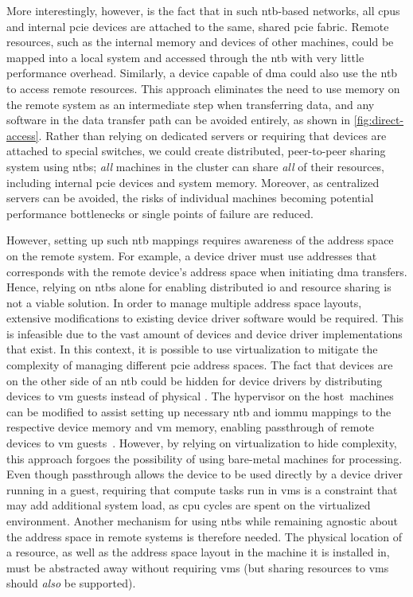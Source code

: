 More interestingly, however, is the fact that in such \gls{ntb}-based networks, all \glspl{cpu} and internal \gls{pcie} devices are attached to the same, shared \gls{pcie} fabric.
%
Remote resources, such as the internal memory and devices of other machines, could be mapped into a local system and accessed through the \gls{ntb} with very little performance overhead.
%
Similarly, a device capable of \gls{dma} could also use the \gls{ntb} to access remote resources.
%
This approach eliminates the need to use memory on the remote system as an intermediate step when transferring data, and any software in the data transfer path can be avoided entirely, as shown in \cref{fig:direct-access}.
%
Rather than relying on dedicated servers or requiring that devices are attached to special switches, we could create distributed, peer-to-peer sharing system using \glspl{ntb};
%
\emph{all} machines in the cluster can share \emph{all} of their resources, including internal \gls{pcie} devices and system memory. 
%
Moreover, as centralized servers can be avoided, the risks of individual machines becoming potential performance bottlenecks or single points of failure are reduced.



However, setting up such \gls{ntb} mappings requires awareness of the address space on the remote system.
%
For example, a device driver must use addresses that corresponds with the remote device's address space when initiating \gls{dma} transfers.
%
Hence, relying on \glspl{ntb} alone for enabling distributed \gls{io} and resource sharing is not a viable solution.
%
In order to manage multiple address space layouts, extensive modifications to existing device driver software would be required.
%
This is infeasible due to the vast amount of devices and device driver implementations that exist.
%
In this context, it is possible to use virtualization to mitigate the complexity of managing different \gls{pcie} address spaces.
%
The fact that devices are on the other side of an \gls{ntb} could be hidden for device drivers by distributing devices to \gls{vm} \glspl{guest} instead of physical .
%
The \gls{hypervisor} on the host~machines can be modified to assist setting up necessary \gls{ntb} and \gls{iommu} mappings to the respective device memory and \gls{vm} memory, enabling \gls{passthrough} of remote devices to \gls{vm} \glspl{guest}~\cite{Tu2013}.
%
However, by relying on virtualization to hide complexity, this approach forgoes the possibility of using bare-metal machines for processing.
%
Even though \gls{passthrough} allows the device to be used directly by a device driver running in a \gls{guest}, requiring that compute tasks run in \glspl{vm} is a constraint that may add additional system load, as \gls{cpu} cycles are spent on  the virtualized environment.
%
Another mechanism for using \glspl{ntb} while remaining agnostic about the address space in remote systems is therefore needed.
%
The physical location of a resource, as well as the address space layout in the machine it is installed in, must be abstracted away without requiring \glspl{vm} (but sharing resources to \glspl{vm} should \emph{also} be supported).



